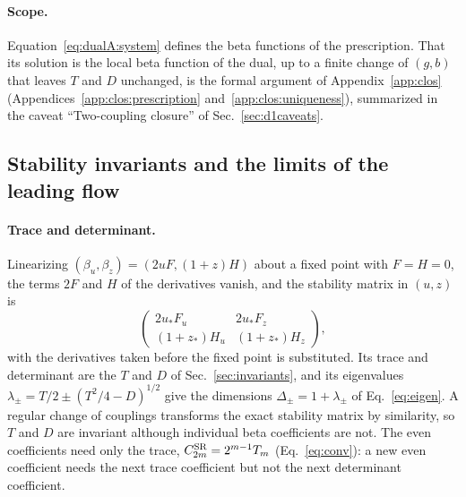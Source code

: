 \documentclass[11pt,a4paper]{article}
\numberwithin{equation}{section}
\newcommand{\CSR}{C^{\rm SR}}
\begin{document}
\paragraph{Scope.} Equation~\eqref{eq:dualA:system} defines the beta functions of the prescription. That its
solution is the local beta function of the dual, up to a finite change of $(g,b)$ that leaves $T$ and $D$ unchanged,
is the formal argument of Appendix~\ref{app:clos} (Appendices~\ref{app:clos:prescription} and~\ref{app:clos:uniqueness}), summarized in the caveat ``Two-coupling
closure'' of Sec.~\ref{sec:d1caveats}.

\subsection{Stability invariants and the limits of the leading flow}\label{app:dualA:invariants}
\paragraph{Trace and determinant.} Linearizing $(\beta_u,\beta_z)=(2uF,(1+z)H)$ about a fixed point with $F=H=0$,
the terms $2F$ and $H$ of the derivatives vanish, and the stability matrix in $(u,z)$ is
\begin{equation}
 \begin{pmatrix} 2u_*F_u & 2u_*F_z\\ (1+z_*)H_u & (1+z_*)H_z\end{pmatrix},
 \label{eq:dualA:stability}
\end{equation}
with the derivatives taken before the fixed point is substituted. Its trace and determinant are the $T$ and $D$ of
Sec.~\ref{sec:invariants}, and its eigenvalues $\lambda_\pm=T/2\pm(T^2/4-D)^{1/2}$ give the dimensions
$\Delta_\pm=1+\lambda_\pm$ of Eq.~\eqref{eq:eigen}. A regular change of couplings transforms the exact stability
matrix by similarity, so $T$ and $D$ are invariant although individual beta coefficients are not. The even
coefficients need only the trace, $\CSR_{2m}=2^{m-1}T_m$ (Eq.~\eqref{eq:conv}): a new even coefficient needs the next
trace coefficient but not the next determinant coefficient.
\end{document}
